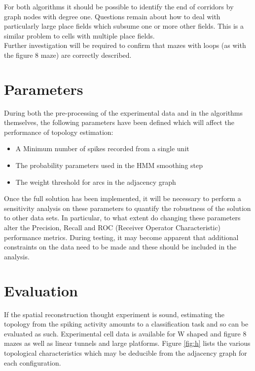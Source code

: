\documentclass[11pt]{report}
\begin{document}
For both algorithms it should be possible to identify the end of corridors by graph nodes with degree one. Questions remain about how to deal with particularly large place fields which subsume one or more other fields. This is a similar problem to cells with multiple place fields. \\
Further investigation will be required to confirm that mazes with loops (as with the figure 8 maze) are correctly described.\\

\section{Parameters}
During both the pre-processing of the experimental data and in the algorithms themselves, the following parameters have been defined which will affect the performance of topology estimation:\\
\begin{itemize}
\item A Minimum number of spikes recorded from a single unit
\item The probability parameters used in the HMM smoothing step
\item The weight threshold for arcs in the adjacency graph
\end{itemize}
 
Once the full solution has been implemented, it will be necessary to perform a sensitivity analysis on these parameters to quantify the robustness of the solution to other data sets. In particular, to what extent do changing these parameters alter the Precision, Recall and ROC (Receiver Operator Characteristic) performance metrics. During testing, it may become apparent that additional constraints on the data need to be made and these should be included in the analysis.\\

\section{Evaluation}
If the spatial reconstruction thought experiment is sound, estimating the topology from the spiking activity amounts to a classification task and so can be evaluated as such. Experimental cell data is available for W shaped and figure 8 mazes as well as linear tunnels and large platforms. Figure \ref{fig:h} lists the various topological characteristics which may be deducible from the adjacency graph for each configuration.
\end{document}
